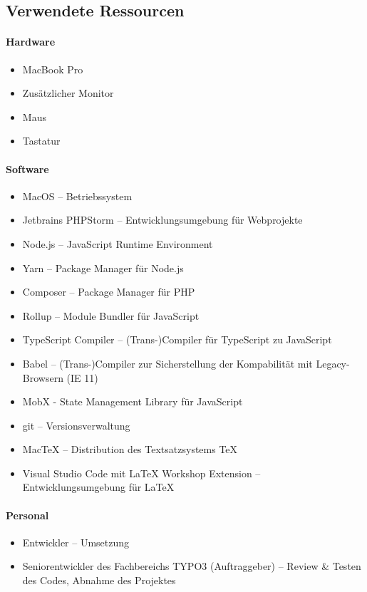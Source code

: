 \subsection{Verwendete Ressourcen}
\label{app:Ressourcen}
\paragraph{Hardware}
\begin{itemize}
	\item MacBook Pro
	\item Zusätzlicher Monitor
	\item Maus
	\item Tastatur
\end{itemize}

\paragraph{Software}
\begin{itemize}
	\item MacOS – Betriebssystem
	\item Jetbrains PHPStorm – Entwicklungsumgebung für Webprojekte 
	\item Node.js – JavaScript Runtime Environment
	\item Yarn – Package Manager für Node.js
	\item Composer – Package Manager für PHP
	\item Rollup – Module Bundler für JavaScript
	\item TypeScript Compiler – (Trans-)Compiler für TypeScript zu JavaScript
	\item Babel – (Trans-)Compiler zur Sicherstellung der Kompabilität mit Legacy-Browsern (IE 11)
	\item MobX - State Management Library für JavaScript
	\item git – Versionsverwaltung
	\item MacTeX – Distribution des Textsatzsystems \TeX
	\item Visual Studio Code mit LaTeX Workshop Extension – Entwicklungsumgebung für \LaTeX
\end{itemize}

\paragraph{Personal}
\begin{itemize}
	\item Entwickler – Umsetzung
	\item Seniorentwickler des Fachbereichs TYPO3 (Auftraggeber) – Review \& Testen des Codes, Abnahme des Projektes
\end{itemize}